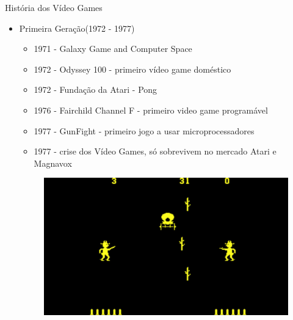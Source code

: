 \documentclass[xcolor=svgnames,handout]{beamer}
\begin{document}
\begin{frame}{História dos Vídeo Games}
\begin{itemize}
	\item Primeira Geração(1972 - 1977)
	\begin{itemize}
	\item 1971 - Galaxy Game and Computer Space\pause
	\item 1972 - Odyssey 100 - primeiro vídeo game doméstico\pause
	\item 1972 - Fundação da Atari - Pong\pause
	\item 1976 - Fairchild Channel F - primeiro video game programável\pause
	\item 1977 - GunFight - primeiro jogo a usar microprocessadores\pause
	\item 1977 - crise dos Vídeo Games, só sobrevivem no mercado Atari e Magnavox\pause
	\end{itemize}
	\begin{figure}[t]
    \centering
	    \includegraphics[scale=0.1]{imagens/gunfight}
	\end{figure}
\end{itemize}
\end{frame}
\end{document}
